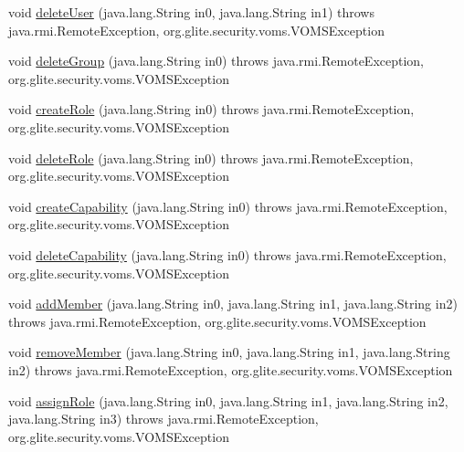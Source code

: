 \begin{DoxyCompactItemize}
\item 
void \hyperlink{interfaceorg_1_1glite_1_1security_1_1voms_1_1service_1_1admin_1_1VOMSAdmin_a47c8e0f360ea6ffa7ec11e463965788c}{deleteUser} (java.lang.String in0, java.lang.String in1)  throws java.rmi.RemoteException, org.glite.security.voms.VOMSException
\item 
void \hyperlink{interfaceorg_1_1glite_1_1security_1_1voms_1_1service_1_1admin_1_1VOMSAdmin_af9fef1bd825f0c441d2b3476471385f6}{deleteGroup} (java.lang.String in0)  throws java.rmi.RemoteException, org.glite.security.voms.VOMSException
\item 
void \hyperlink{interfaceorg_1_1glite_1_1security_1_1voms_1_1service_1_1admin_1_1VOMSAdmin_ab8472ec890af94dd4d5e1655e181b5b3}{createRole} (java.lang.String in0)  throws java.rmi.RemoteException, org.glite.security.voms.VOMSException
\item 
void \hyperlink{interfaceorg_1_1glite_1_1security_1_1voms_1_1service_1_1admin_1_1VOMSAdmin_adf36b4ddff06962101c268e1e032f7cb}{deleteRole} (java.lang.String in0)  throws java.rmi.RemoteException, org.glite.security.voms.VOMSException
\item 
void \hyperlink{interfaceorg_1_1glite_1_1security_1_1voms_1_1service_1_1admin_1_1VOMSAdmin_a55698e09753f88c5b6934a5481caf129}{createCapability} (java.lang.String in0)  throws java.rmi.RemoteException, org.glite.security.voms.VOMSException
\item 
void \hyperlink{interfaceorg_1_1glite_1_1security_1_1voms_1_1service_1_1admin_1_1VOMSAdmin_af3fc436266d432bba0e4b3011bd7bf79}{deleteCapability} (java.lang.String in0)  throws java.rmi.RemoteException, org.glite.security.voms.VOMSException
\item 
void \hyperlink{interfaceorg_1_1glite_1_1security_1_1voms_1_1service_1_1admin_1_1VOMSAdmin_a1009495645c72839d744c0228b75f2ad}{addMember} (java.lang.String in0, java.lang.String in1, java.lang.String in2)  throws java.rmi.RemoteException, org.glite.security.voms.VOMSException
\item 
void \hyperlink{interfaceorg_1_1glite_1_1security_1_1voms_1_1service_1_1admin_1_1VOMSAdmin_a5b702a9b5a884d9a83ee6302674d8ef3}{removeMember} (java.lang.String in0, java.lang.String in1, java.lang.String in2)  throws java.rmi.RemoteException, org.glite.security.voms.VOMSException
\item 
void \hyperlink{interfaceorg_1_1glite_1_1security_1_1voms_1_1service_1_1admin_1_1VOMSAdmin_ae1663c7a603e4ac0d164c2a9ba19162a}{assignRole} (java.lang.String in0, java.lang.String in1, java.lang.String in2, java.lang.String in3)  throws java.rmi.RemoteException, org.glite.security.voms.VOMSException

\end{DoxyCompactItemize}
